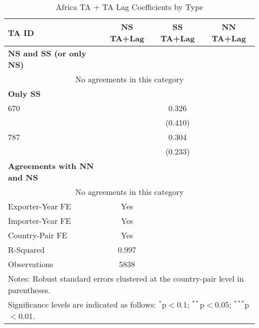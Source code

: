 \begin{table}[htbp]
    \centering
    \caption{Africa TA + TA Lag Coefficients by Type}
    \label{tab:africa_pta}
    \begin{adjustbox}{max width=\textwidth}
    \begin{tabular}{lccc}
    \hline
    \textbf{TA ID} & \textbf{NS TA+Lag} & \textbf{SS TA+Lag} & \textbf{NN TA+Lag} \\
    \hline
    \textbf{NS and SS (or only NS)} &  &  &  \\
    \hline
    \multicolumn{4}{c}{No agreements in this category} \\
    \hline
    \textbf{Only SS} &  &  &  \\
    \hline
    670 &  & 0.326 &  \\
     &  & (0.410) &  \\
    787 &  & 0.304 &  \\
     &  & (0.233) &  \\
    \hline
    \textbf{Agreements with NN and NS} &  &  &  \\
    \hline
    \multicolumn{4}{c}{No agreements in this category} \\
    \hline
    Exporter-Year FE & Yes \\
    Importer-Year FE & Yes \\
    Country-Pair FE & Yes \\
    R-Squared & 0.997 \\
    Observations & 5838 \\
    \hline
    \multicolumn{4}{l}{\footnotesize{Notes: Robust standard errors clustered at the country-pair level in parentheses.}} \\
    \multicolumn{4}{l}{\footnotesize{Significance levels are indicated as follows: $^{\ast}$p$<$0.1; $^{\ast\ast}$p$<$0.05; $^{\ast\ast\ast}$p$<$0.01.}} \\
    \end{tabular}
    \end{adjustbox}
\end{table}
